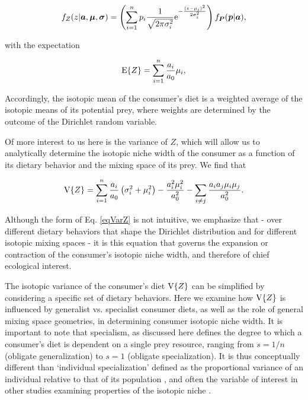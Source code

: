 \documentclass{frontiersSCNS}
\begin{document}
\begin{equation}
  \label{eqfZ}
f_Z(z|{\bm a},{\bm \mu},{\bm \sigma}) = \left(\sum_{i=1}^n p_i\frac{1}{\sqrt{2 \pi \sigma_i^2}}{\rm e}^{-\frac{(z-\mu_i)^2}{2\sigma_i^2}}\right)f_{\bm P}(\bm p | \bm a),
\end{equation}


\noindent with the expectation

\begin{equation}
\label{eqEZ}
  {\rm E}\{Z\} = \sum_{i=1}^n \frac{a_i}{a_0} \mu_i,
\end{equation}

\noindent Accordingly, the isotopic mean of the consumer's diet is a weighted average of the isotopic means of its potential prey, where weights are determined by the outcome of the Dirichlet random variable.

Of more interest to us here is the variance of $Z$, which will allow us to analytically determine the isotopic niche width of the consumer as a function of its dietary behavior and the mixing space of its prey.
We find that

\begin{equation}
\label{eqVarZ}
  {\rm V}\{Z\} = \sum_{i=1}^n \frac{a_i}{a_0}\left(\sigma_i^2 + \mu_i^2\right) - \frac{a_i^2\mu_i^2}{a_0^2}-\sum_{i \neq j}\frac{a_i a_j \mu_i \mu_j}{a_0^2}.
\end{equation}

\noindent Although the form of Eq. \ref{eqVarZ} is not intuitive, we emphasize that - over different dietary behaviors that shape the Dirichlet distribution and for different isotopic mixing spaces - it is this equation that governs the expansion or contraction of the consumer's isotopic niche width, and therefore of chief ecological interest.

The isotopic variance of the consumer's diet ${\rm V}\{Z\}$ can be simplified by considering a specific set of dietary behaviors.
Here we examine how ${\rm V}\{Z\}$ is influenced by generalist vs. specialist consumer diets, as well as the role of general mixing space geometries, in determining consumer isotopic niche width.
It is important to note that specialism, as discussed here defines the degree to which a consumer's diet is dependent on a single prey resource, ranging from $s=1/n$ (obligate generalization) to $s=1$ (obligate specialization).
It is thus conceptually different than `individual specialization' defined as the proportional variance of an individual relative to that of its population \citep[Within-Individual Component / Total Niche Width, or WIC/TNW;][]{J:1979wc}, and often the variable of interest in other studies examining properties of the isotopic niche \citep{Araujo:2007iua,Araujo:2009p2286,Araujo:2011gm,Layman:2011cm}.
\end{document}
